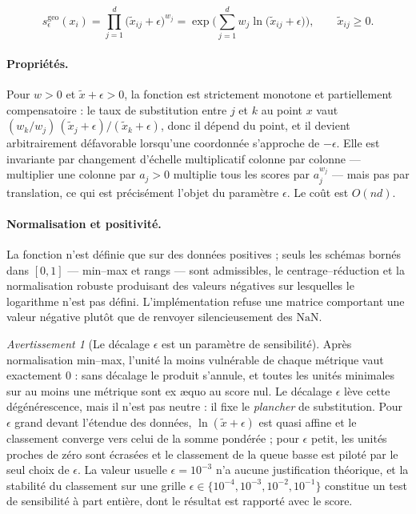 \documentclass[11pt,a4paper]{article}
\theoremstyle{definition}
\theoremstyle{remark}
\newtheorem{avertissement}{Avertissement}[section]
\begin{document}
\medskip

\[
  s^{\mathrm{geo}}_{\epsilon}(x_i)
  = \prod_{j=1}^{d} \big(\tilde{x}_{ij} + \epsilon\big)^{w_j}
  = \exp\!\Big(\sum_{j=1}^{d} w_j \ln\big(\tilde{x}_{ij} + \epsilon\big)\Big),
  \qquad \tilde{x}_{ij} \ge 0 .
\]

\bigskip

\paragraph{Propriétés.} Pour $w > 0$ et $\tilde{x} + \epsilon > 0$, la fonction est
strictement monotone et partiellement compensatoire : le taux de substitution entre $j$ et
$k$ au point $x$ vaut $(w_k/w_j)\,(\tilde{x}_j + \epsilon)/(\tilde{x}_k + \epsilon)$, donc
il dépend du point, et il devient arbitrairement défavorable lorsqu'une coordonnée
s'approche de $-\epsilon$. Elle est invariante par changement d'échelle multiplicatif
colonne par colonne --- multiplier une colonne par $a_j > 0$ multiplie tous les scores par
$a_j^{w_j}$ --- mais pas par translation, ce qui est précisément l'objet du paramètre
$\epsilon$. Le coût est $O(nd)$.

\bigskip

\paragraph{Normalisation et positivité.} La fonction n'est définie que sur des données
positives ; seuls les schémas bornés dans $[0,1]$ --- min--max et rangs --- sont
admissibles, le centrage--réduction et la normalisation robuste produisant des valeurs
négatives sur lesquelles le logarithme n'est pas défini. L'implémentation refuse une
matrice comportant une valeur négative plutôt que de renvoyer silencieusement des
$\mathrm{NaN}$.

\medskip

\begin{avertissement}[Le décalage $\epsilon$ est un paramètre de sensibilité]
  \label{av:epsilon-geo}
  Après normalisation min--max, l'unité la moins vulnérable de chaque métrique vaut
  exactement $0$ : sans décalage le produit s'annule, et toutes les unités minimales sur
  au moins une métrique sont ex \ae quo au score nul. Le décalage $\epsilon$ lève cette
  dégénérescence, mais il n'est pas neutre : il fixe le \emph{plancher} de substitution.
  Pour $\epsilon$ grand devant l'étendue des données, $\ln(\tilde{x} + \epsilon)$ est
  quasi affine et le classement converge vers celui de la somme pondérée ; pour $\epsilon$
  petit, les unités proches de zéro sont écrasées et le classement de la queue basse est
  piloté par le seul choix de $\epsilon$. La valeur usuelle $\epsilon = 10^{-3}$ n'a
  aucune justification théorique, et la stabilité du classement sur une grille
  $\epsilon \in \{10^{-4}, 10^{-3}, 10^{-2}, 10^{-1}\}$ constitue un test de sensibilité à
  part entière, dont le résultat est rapporté avec le score.
\end{avertissement}
\end{document}

